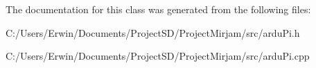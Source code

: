 The documentation for this class was generated from the following files\+:\begin{DoxyCompactItemize}
\item 
C\+:/\+Users/\+Erwin/\+Documents/\+Project\+S\+D/\+Project\+Mirjam/src/ardu\+Pi.\+h\item 
C\+:/\+Users/\+Erwin/\+Documents/\+Project\+S\+D/\+Project\+Mirjam/src/ardu\+Pi.\+cpp\end{DoxyCompactItemize}
